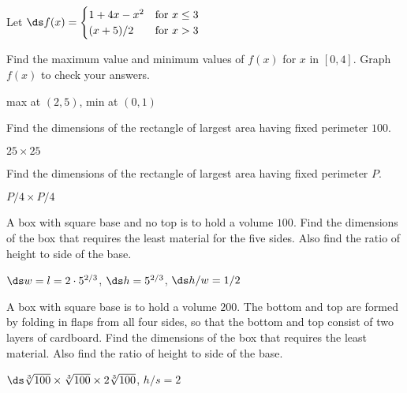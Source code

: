 \begin{exercises}

\begin{exercise}
Let $\ds f(x) = \begin{cases}
1 + 4 x -x^2 & \text{for } x\leq 3 \\
            (x+5)/2          &\text{for } x>3
\end{cases}$

\item{} Find the maximum value and minimum values of $f(x)$ for $x$ in $[0,4]$.
Graph $f(x)$ to check your answers.
\begin{answer} max at $(2,5)$, min at $(0,1)$
\end{answer}\end{exercise}

\begin{exercise}
Find the dimensions of the rectangle of largest area having fixed perimeter
$100$.
\begin{answer} $25\times 25$
\end{answer}\end{exercise}

\begin{exercise}
Find the dimensions of the rectangle of largest area having fixed perimeter
$P$.
\begin{answer} $P/4\times P/4$
\end{answer}\end{exercise}

\begin{exercise}
A box with square base and no top is to hold a volume $100$.  Find
the dimensions of the box that requires the least material for the
five sides.  Also find the ratio of height to side of the base.
\begin{answer} $\ds w=l=2\cdot 5^{2/3}$, $\ds h=5^{2/3}$, $\ds h/w=1/2$
\end{answer}\end{exercise}


\begin{exercise} A box with square base is to hold a volume
$200$. The bottom and top are formed by folding in flaps from all four
sides, so that the bottom and top consist of two layers of cardboard.
Find the dimensions of the box that requires the least material.
Also find the ratio of height to side of the base.
\begin{answer} $\ds \root 3\of {100}\times\root 3\of {100}\times 2\root 3\of
{100}$, $h/s=2$
\end{answer}\end{exercise}


\end{exercises}
